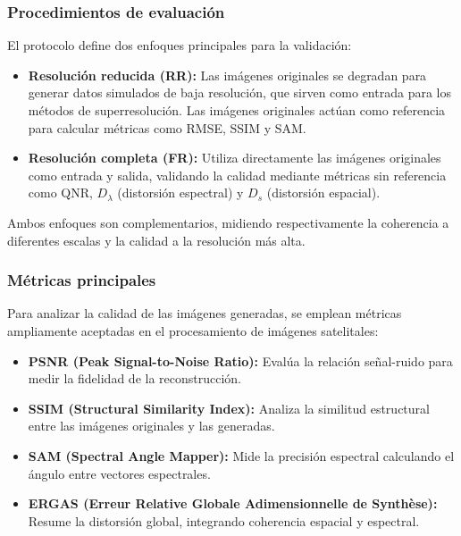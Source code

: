         \subsubsection{Procedimientos de evaluación}
        
            El protocolo define dos enfoques principales para la validación:
            
            \begin{itemize}
                \item \textbf{Resolución reducida (RR):} Las imágenes originales se degradan para generar datos simulados de baja resolución, que sirven como entrada para los métodos de superresolución. Las imágenes originales actúan como referencia para calcular métricas como RMSE, SSIM y SAM.
                \item \textbf{Resolución completa (FR):} Utiliza directamente las imágenes originales como entrada y salida, validando la calidad mediante métricas sin referencia como QNR, $D_\lambda$ (distorsión espectral) y $D_s$ (distorsión espacial).
            \end{itemize}
            
            Ambos enfoques son complementarios, midiendo respectivamente la coherencia a diferentes escalas y la calidad a la resolución más alta.
        
        \subsubsection{Métricas principales}
        
            Para analizar la calidad de las imágenes generadas, se emplean métricas ampliamente aceptadas en el procesamiento de imágenes satelitales:
            
            \begin{itemize}
                \item \textbf{PSNR (Peak Signal-to-Noise Ratio):} Evalúa la relación señal-ruido para medir la fidelidad de la reconstrucción.
                \item \textbf{SSIM (Structural Similarity Index):} Analiza la similitud estructural entre las imágenes originales y las generadas.
                \item \textbf{SAM (Spectral Angle Mapper):} Mide la precisión espectral calculando el ángulo entre vectores espectrales.
                \item \textbf{ERGAS (Erreur Relative Globale Adimensionnelle de Synthèse):} Resume la distorsión global, integrando coherencia espacial y espectral.
            \end{itemize}
        
